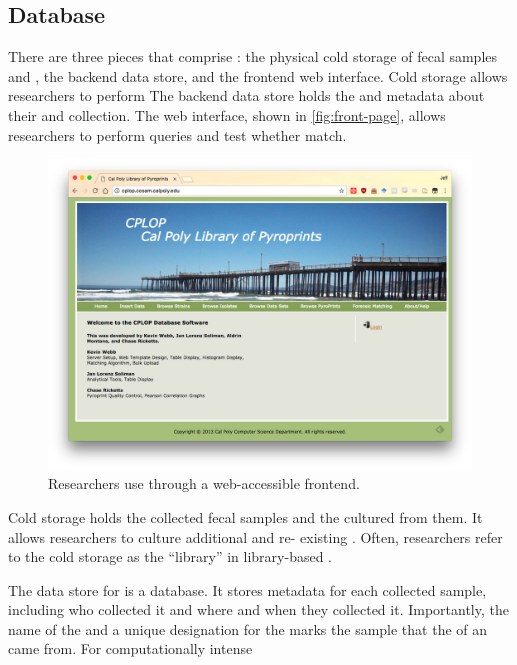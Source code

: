 \subsection{Database}
There are three pieces that comprise \cplop{}: the physical cold storage of fecal samples and \isols{}, the backend data store, and the frontend web interface.
Cold storage allows \cplop{} researchers to perform 
The backend data store holds the \pyros{} and metadata about their \spec{} and collection.
The web interface, shown in \autoref{fig:front-page}, allows researchers to perform queries and test whether \isols{} match.
\begin{figure}
    \centering
    \includegraphics[width=\frontendwidth]{figures/frontend/front-page}
    \caption{Researchers use \cplop{} through a web-accessible frontend.}
    \label{fig:front-page}
\end{figure}

Cold storage holds the collected fecal samples and the \isols{} cultured from them.
It allows \cplop{} researchers to culture additional \isols{} and re-\pyro{} existing \isols{}.
Often, researchers refer to the cold storage as the ``library'' in library-based \mst{}.

The data store for \cplop{} \pyros{} is a \mysql{} database.
It stores metadata for each collected sample, including who collected it and where and when they collected it.
Importantly, the name of the \spec{} and a unique designation for the \host{} marks the sample that the \pyros{} of an \isol{} came from.
For computationally intense 


